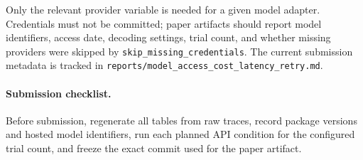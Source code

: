 Only the relevant provider variable is needed for a given model adapter. Credentials must not be committed; paper artifacts should report model identifiers, access date, decoding settings, trial count, and whether missing providers were skipped by \texttt{skip\_missing\_credentials}. The current submission metadata is tracked in \texttt{reports/model\_access\_cost\_latency\_retry.md}.

\paragraph{Submission checklist.}
Before submission, regenerate all tables from raw traces, record package versions and hosted model identifiers, run each planned API condition for the configured trial count, and freeze the exact commit used for the paper artifact.
